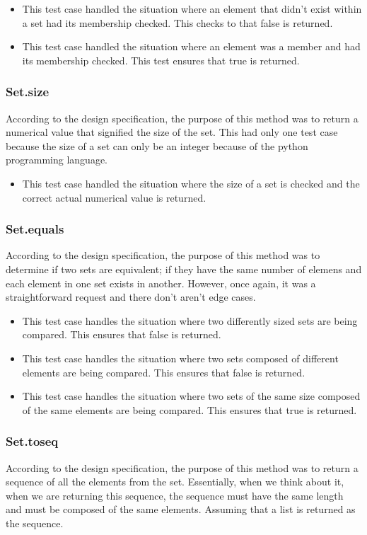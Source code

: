 \documentclass[12pt]{article}
\begin{document}
\begin{itemize}
  \item This test case handled the situation where an element that didn't exist within a set had its membership checked. This checks to that false is returned.
  \item This test case handled the situation where an element was a member and had its membership checked. This test ensures that true is returned.
\end{itemize}

\subsubsection{Set.size}
According to the design specification, the purpose of this method was to return a numerical value that signified the
size of the set. This had only one test case because the size of a set can only be an integer because of the python programming language.

\begin{itemize}
  \item This test case handled the situation where the size of a set is checked and the correct actual numerical value is returned.
\end{itemize}

\subsubsection{Set.equals}
According to the design specification, the purpose of this method was to determine if two sets are equivalent; if they have the same
number of elemens and each element in one set exists in another. However, once again, it was a straightforward request and there don't 
aren't edge cases.

\begin{itemize}
  \item This test case handles the situation where two differently sized sets are being compared. This ensures that false is returned.
  \item This test case handles the situation where two sets composed of different elements are being compared. This ensures that false is returned.
  \item This test case handles the situation where two sets of the same size composed of the same elements are being compared. This ensures that true is returned.
\end{itemize}


\subsubsection{Set.to\textunderscore seq}
According to the design specification, the purpose of this method was to return a sequence of all the elements from the set.
Essentially, when we think about it, when we are returning this sequence, the sequence must have the same length and must be composed
of the same elements. Assuming that a list is returned as the sequence.
\end{document}
